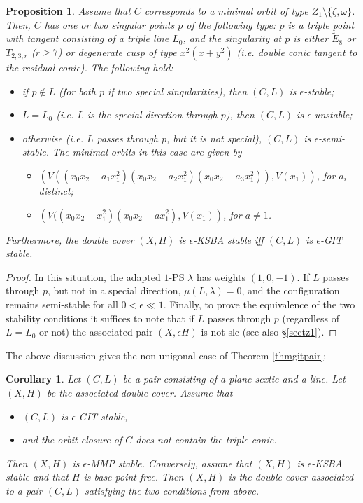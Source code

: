 \documentclass{amsart}
\numberwithin{equation}{section}
\theoremstyle{plain}
\newtheorem{proposition}[equation]{Proposition}
\newtheorem{corollary}[equation]{Corollary}
\theoremstyle{remark}
\theoremstyle{definition}
\newcommand{\Ee}{\widetilde{E}_8}
\begin{document}
\begin{proposition}\label{proppairz1}
Assume that $C$ corresponds to a minimal orbit of type $\overline Z_1\setminus \{\zeta,\omega\}$. Then, $C$ has one or two singular points $p$ of the following type: $p$ is a triple point with tangent consisting of a triple line $L_0$, and the singularity at $p$ is either $\Ee$ or $T_{2,3,r}$ ($r\ge 7$) or degenerate cusp of type $x^2(x+y^2)$ (i.e. double conic tangent to the residual conic). The following hold:
\begin{itemize}
\item[i)] if $p\not \in L$ (for both $p$  if  two special singularities), then $(C,L)$ is $\epsilon$-stable;
\item[ii)] $L=L_0$ (i.e. $L$ is the special direction through $p$), then $(C,L)$ is $\epsilon$-unstable;
\item[iii)] otherwise (i.e. $L$ passes through $p$, but it is not special), $(C,L)$ is $\epsilon$-semi-stable.   The minimal orbits in this case are given by 
\begin{itemize}
\item[(Case $Z_1$)] $\left(V((x_0x_2-a_1x_1^2)(x_0x_2-a_2x_1^2)(x_0x_2-a_3x_1^2)), V(x_1)\right)$, for  $a_i$ distinct; 
\item[(Case $\tau$)] $\left(V((x_0x_2-x_1^2)(x_0x_2-ax_1^2),V(x_1)\right)$, for $a\neq 1$.
\end{itemize} 
\end{itemize}
Furthermore, the double cover $(X,H)$ is $\epsilon$-KSBA stable iff $(C,L)$ is $\epsilon$-GIT stable. 
\end{proposition}
\begin{proof}
In this situation, the adapted $1$-PS $\lambda$ has weights $(1,0,-1)$. If $L$ passes through $p$, but not in a special direction, $\mu(L,\lambda)=0$, and the configuration remains semi-stable for all $0<\epsilon\ll 1$. Finally, to prove the equivalence of the two stability conditions it suffices to note that if $L$ passes through $p$ (regardless of $L=L_0$ or not)  the associated pair $(X,\epsilon H)$ is not slc (see also \S\ref{sectz1}). 
\end{proof}

The above discussion gives the non-unigonal case of Theorem \ref{thmgitpair}: 
\begin{corollary}\label{cornonunigonal}
Let $(C,L)$ be a pair consisting of a plane sextic and a line. Let $(X,H)$ be the associated double cover. Assume that 
\begin{itemize}
\item[i)] $(C,L)$ is $\epsilon$-GIT stable,
\item[ii)] and the orbit closure of  $C$ does not contain the triple conic.  
\end{itemize}
Then $(X,H)$ is $\epsilon$-MMP stable. Conversely, assume that $(X,H)$ is $\epsilon$-KSBA stable  and that $H$ is base-point-free. Then $(X,H)$ is the double cover associated to a pair $(C,L)$ satisfying the two conditions from above. 
\end{corollary}
\end{document}

